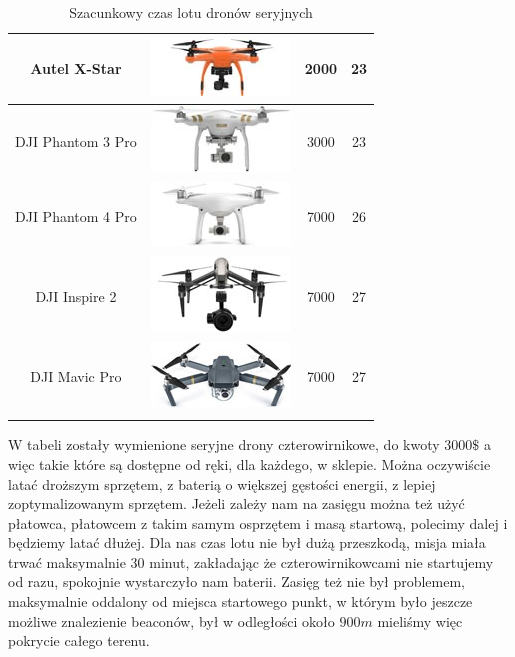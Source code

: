 \begin{longtable}{|c|c|c|c|}
    	    Autel X-Star & \includegraphics{zalaczniki/obrazy/drony_miniaturki/autel.jpg} & 2000 & 23 \\ \hline
    	    DJI Phantom 3 Pro & \includegraphics{zalaczniki/obrazy/drony_miniaturki/dji-phantom-3-professional.jpg} & 3000 & 23 \\ \hline
    	    DJI Phantom 4 Pro & \includegraphics{zalaczniki/obrazy/drony_miniaturki/DJI-Phantom-4.jpg} & 7000 & 26 \\ \hline
    	    DJI Inspire 2 & \includegraphics{zalaczniki/obrazy/drony_miniaturki/dji_inspire.jpg} & 7000 & 27 \\ \hline
    	    DJI Mavic Pro & \includegraphics{zalaczniki/obrazy/drony_miniaturki/dji_mavic.jpg} & 7000 & 27 \\ \hline
    \caption{Szacunkowy czas lotu dronów seryjnych \cite{szacunkowyczaslotu}}
    \label{tab:czasLotuDronow}
\end{longtable}

W tabeli zostały wymienione seryjne drony czterowirnikowe, do kwoty $3000\$$ a więc takie które są dostępne od ręki, dla każdego, w sklepie. Można oczywiście latać droższym sprzętem, z baterią o większej gęstości energii, z lepiej zoptymalizowanym sprzętem. Jeżeli zależy nam na zasięgu można też użyć płatowca, płatowcem z takim samym osprzętem i masą startową, polecimy dalej i będziemy latać dłużej. Dla nas czas lotu nie był dużą przeszkodą, misja miała trwać maksymalnie 30 minut, zakładając że czterowirnikowcami nie startujemy od razu, spokojnie wystarczyło nam baterii. Zasięg też nie był problemem, maksymalnie oddalony od miejsca startowego punkt, w którym było jeszcze możliwe znalezienie beaconów, był w odległości około $900 m$ mieliśmy więc pokrycie całego terenu.

